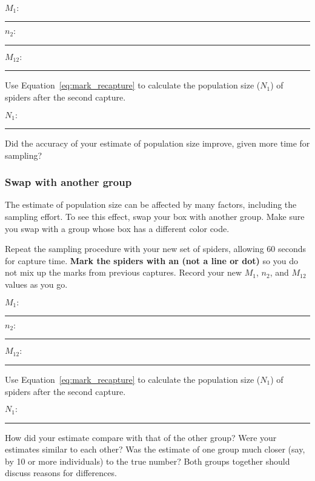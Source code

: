 \documentclass[12pt, hidelinks]{exam}
\begin{document}
\begin{questions}
	\begin{multicols}{2}
	$M_1\colon$  \rule{0.75in}{0.4pt} \bigskip
	
	$n_2\colon$ \rule{0.75in}{0.4pt}
	
	\columnbreak
	
	$M_{12}\colon$ \rule{0.75in}{0.4pt} \bigskip
	
\end{multicols}

\question
Use Equation~\ref{eq:mark_recapture} to calculate the population size ($N_1$) of
spiders after the second capture. \bigskip

$N_1\colon$ \rule{0.75in}{0.4pt}

\question
Did the accuracy of your estimate of population size improve, given more time for sampling? 

\vspace*{2\baselineskip}


\subsubsection*{Swap with another group}

The estimate of population size can be affected by many factors, including the sampling effort. To see this effect, swap your box with another group. Make sure you swap with a group whose box has a different color code.


Repeat the sampling procedure with your new set of spiders, allowing 60 seconds for capture time. \textbf{Mark the spiders with an  (not a line or dot)} so you do not mix up the marks from previous captures. Record your new $M_1$, $n_2$, and $M_{12}$ values as you go. %

	\begin{multicols}{2}
	$M_1\colon$  \rule{0.75in}{0.4pt} \bigskip
	
	$n_2\colon$ \rule{0.75in}{0.4pt}
	
	\columnbreak
	
	$M_{12}\colon$ \rule{0.75in}{0.4pt} \bigskip
	
\end{multicols}

\question
Use Equation~\ref{eq:mark_recapture} to calculate the population size ($N_1$) of
spiders after the second capture. \bigskip

$N_1\colon$ \rule{0.75in}{0.4pt}

\question
How did your estimate compare with that of the other group? Were your estimates similar to each other? Was the estimate of one group much closer (say, by 10 or more individuals) to the true number? Both groups together should discuss reasons for differences.


\end{questions}
\end{document}
